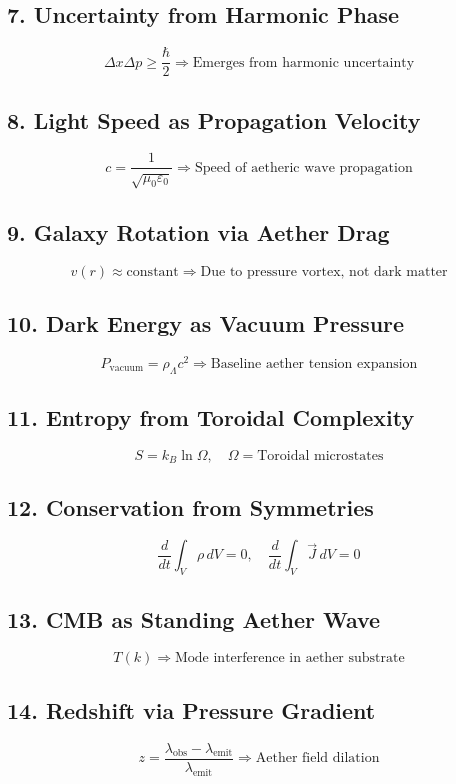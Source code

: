 \documentclass[12pt]{article}
\begin{document}
\subsection*{7. Uncertainty from Harmonic Phase}
\[
\Delta x \Delta p \geq \frac{\hbar}{2} \Rightarrow \text{Emerges from harmonic uncertainty}
\]

\subsection*{8. Light Speed as Propagation Velocity}
\[
c = \frac{1}{\sqrt{\mu_0 \varepsilon_0}} \Rightarrow \text{Speed of aetheric wave propagation}
\]

\subsection*{9. Galaxy Rotation via Aether Drag}
\[
v(r) \approx \text{constant} \Rightarrow \text{Due to pressure vortex, not dark matter}
\]

\subsection*{10. Dark Energy as Vacuum Pressure}
\[
P_{\text{vacuum}} = \rho_{\Lambda} c^2 \Rightarrow \text{Baseline aether tension expansion}
\]

\subsection*{11. Entropy from Toroidal Complexity}
\[
S = k_B \ln \Omega, \quad \Omega = \text{Toroidal microstates}
\]

\subsection*{12. Conservation from Symmetries}
\[
\frac{d}{dt} \int_V \rho \, dV = 0, \quad \frac{d}{dt} \int_V \vec{J} \, dV = 0
\]

\subsection*{13. CMB as Standing Aether Wave}
\[
T(k) \Rightarrow \text{Mode interference in aether substrate}
\]

\subsection*{14. Redshift via Pressure Gradient}
\[
z = \frac{\lambda_{\text{obs}} - \lambda_{\text{emit}}}{\lambda_{\text{emit}}} \Rightarrow \text{Aether field dilation}
\]
\end{document}
